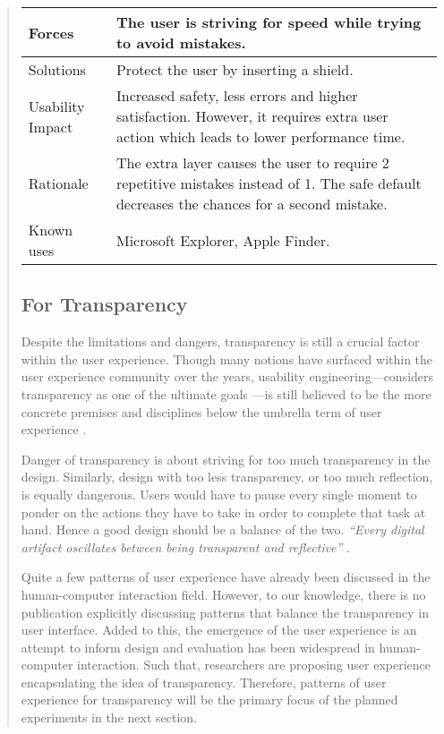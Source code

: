 \documentclass[a4paper,titlepage]{article}
\begin{document}
\begin{quote}
\begin{table}[!t]
\begin{center}
\begin{tabular}{| p{} || p{} |}
      Forces & The user is striving for speed while trying to avoid
      mistakes. \\ \hline

      Solutions & Protect the user by inserting a shield. \\ \hline

      Usability Impact & Increased safety, less errors and higher
      satisfaction. However, it requires extra user action which leads
      to lower performance time. \\ \hline

      Rationale & The extra layer causes the user to require 2
      repetitive mistakes instead of 1. The safe default decreases the
      chances for a second mistake. \\ \hline

      Known uses & Microsoft Explorer, Apple Finder. \\ \hline
    \end{tabular}
  \end{center}
\end{table}

\subsection{For Transparency}
Despite the limitations and dangers, transparency is still a crucial
factor within the user experience. Though many notions have surfaced
within the user experience community over the years, usability
engineering---considers transparency as one of the ultimate goals
\citep{transparency:rutkoski}---is still believed to be the more
concrete premises and disciplines below the umbrella term of user
experience \citep{future:memmel}.

Danger of transparency is about striving for too much transparency in
the design. Similarly, design with too less transparency, or too much
reflection, is equally dangerous. Users would have to pause every
single moment to ponder on the actions they have to take in order to
complete that task at hand. Hence a good design should be a balance of
the two. {\it ``Every digital artifact oscillates between being
  transparent and reflective''} \citep[p.~6]{windows:bolter}.

Quite a few patterns of user experience have already been discussed
\citep{participatory:dearden, speech:zajicek, unix:raymond,
  patterns:tidwell} in the human-computer interaction field. However,
to our knowledge, there is no publication explicitly discussing
patterns that balance the transparency in user interface. Added to
this, the emergence of the user experience is an attempt to inform
design and evaluation has been widespread in human-computer
interaction. Such that, researchers are proposing user experience
encapsulating the idea of transparency. Therefore, patterns of user
experience for transparency will be the primary focus of the planned
experiments in the next section.



\end{quote}
\end{document}
